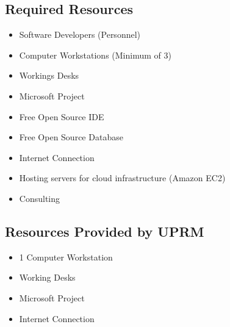 
\subsection{Required Resources}
\begin{itemize}
\item Software Developers (Personnel)
\item Computer Workstations (Minimum of 3)
\item Workings Desks
\item Microsoft Project
\item Free Open Source IDE
\item Free Open Source Database
\item Internet Connection
\item Hosting servers for cloud infrastructure (Amazon EC2)
\item Consulting
\end{itemize}

\subsection{Resources Provided by UPRM}
\begin{itemize}
\item 1 Computer Workstation
\item Working Desks
\item Microsoft Project
\item Internet Connection

\end{itemize}
